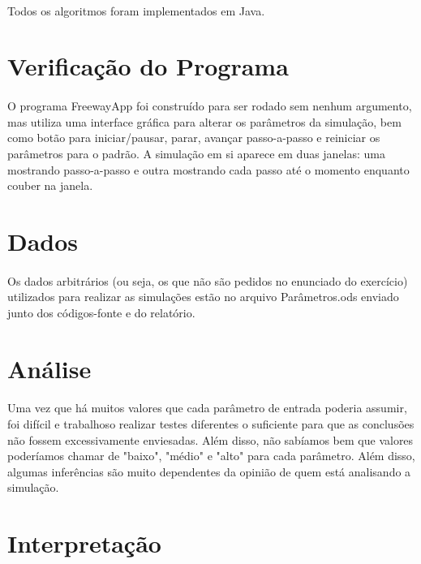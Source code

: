 \documentclass{article}
\begin{document}
\paragraph{}Todos os algoritmos foram implementados em Java.

\section{Verificação do Programa}
\paragraph{}O programa FreewayApp foi construído para ser rodado sem nenhum argumento, mas utiliza uma interface gráfica para alterar os parâmetros da simulação, bem como botão para iniciar/pausar, parar, avançar passo-a-passo e reiniciar os parâmetros para o padrão. A simulação em si aparece em duas janelas: uma mostrando passo-a-passo e outra mostrando cada passo até o momento enquanto couber na janela.

\section{Dados}
\paragraph{}Os dados arbitrários (ou seja, os que não são pedidos no enunciado do exercício) utilizados para realizar as simulações estão no arquivo Parâmetros.ods enviado junto dos códigos-fonte e do relatório.

\section{Análise}
\paragraph{}Uma vez que há muitos valores que cada parâmetro de entrada poderia assumir, foi difícil e trabalhoso realizar testes diferentes o suficiente para que as conclusões não fossem excessivamente enviesadas. Além disso, não sabíamos bem que valores poderíamos chamar de "baixo", "médio" e "alto" para cada parâmetro. Além disso, algumas inferências são muito dependentes da opinião de quem está analisando a simulação.

\section{Interpretação}
\end{document}
